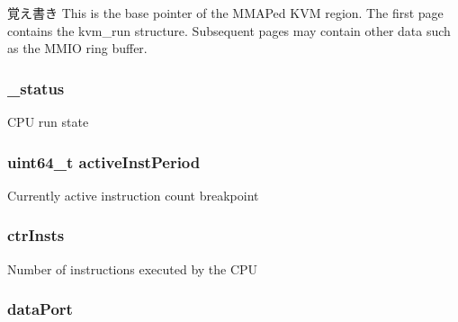\begin{DoxyNote}{覚え書き}
This is the base pointer of the MMAPed KVM region. The first page contains the kvm\_\-run structure. Subsequent pages may contain other data such as the MMIO ring buffer. 
\end{DoxyNote}
\hypertarget{classBaseKvmCPU_a6cdf6e6db875a442f3ab6db542bd2bb5}{
\subsubsection[{\_\-status}]{ {\bf \_\-status}}}
\label{classBaseKvmCPU_a6cdf6e6db875a442f3ab6db542bd2bb5}
CPU run state \hypertarget{classBaseKvmCPU_a9b8c93980540464141f0989b8258295b}{
\subsubsection[{activeInstPeriod}]{\setlength{\rightskip}{0pt plus 5cm}uint64\_\-t {\bf activeInstPeriod}}}
\label{classBaseKvmCPU_a9b8c93980540464141f0989b8258295b}
Currently active instruction count breakpoint \hypertarget{classBaseKvmCPU_a4a8e80967bf91692eb1703752a8203b3}{
\subsubsection[{ctrInsts}]{ {\bf ctrInsts}}}
\label{classBaseKvmCPU_a4a8e80967bf91692eb1703752a8203b3}
Number of instructions executed by the CPU \hypertarget{classBaseKvmCPU_a3f709bd88ed61bca6788f8cc3cda97cb}{
\subsubsection[{dataPort}]{ {\bf dataPort}}}
\label{classBaseKvmCPU_a3f709bd88ed61bca6788f8cc3cda97cb}
